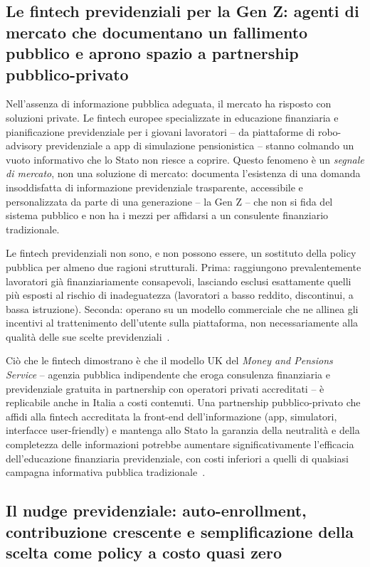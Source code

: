 \subsection{Le fintech previdenziali per la Gen Z:
            agenti di mercato che documentano un fallimento
            pubblico e aprono spazio a partnership pubblico-privato}
\label{subsec:fintech}

Nell'assenza di informazione pubblica adeguata, il mercato ha risposto
con soluzioni private. Le fintech europee specializzate in educazione
finanziaria e pianificazione previdenziale per i giovani lavoratori -- da
piattaforme di robo-advisory previdenziale a app di simulazione
pensionistica -- stanno colmando un vuoto informativo che lo Stato non
riesce a coprire. Questo fenomeno è un \emph{segnale di mercato}, non una
soluzione di mercato: documenta l'esistenza di una domanda insoddisfatta di
informazione previdenziale trasparente, accessibile e personalizzata da parte
di una generazione -- la Gen Z -- che non si fida del sistema pubblico e
non ha i mezzi per affidarsi a un consulente finanziario tradizionale.

Le fintech previdenziali non sono, e non possono essere, un sostituto della
policy pubblica per almeno due ragioni strutturali. Prima: raggiungono
prevalentemente lavoratori già finanziariamente consapevoli, lasciando
esclusi esattamente quelli più esposti al rischio di inadeguatezza
(lavoratori a basso reddito, discontinui, a bassa istruzione). Seconda:
operano su un modello commerciale che ne allinea gli incentivi al
trattenimento dell'utente sulla piattaforma, non necessariamente alla qualità
delle sue scelte previdenziali~\cite{ThalerSunstein2008}.

Ciò che le fintech dimostrano è che il modello UK del \emph{Money and
Pensions Service} -- agenzia pubblica indipendente che eroga consulenza
finanziaria e previdenziale gratuita in partnership con operatori privati
accreditati -- è replicabile anche in Italia a costi contenuti. Una
partnership pubblico-privato che affidi alla fintech accreditata la
front-end dell'informazione (app, simulatori, interfacce user-friendly) e
mantenga allo Stato la garanzia della neutralità e della completezza
delle informazioni potrebbe aumentare significativamente l'efficacia
dell'educazione finanziaria previdenziale, con costi inferiori a quelli
di qualsiasi campagna informativa pubblica tradizionale~\cite{WorldBank2005}.

\subsection{Il nudge previdenziale: auto-enrollment,
            contribuzione crescente e semplificazione della scelta
            come policy a costo quasi zero}
\label{subsec:nudge}

